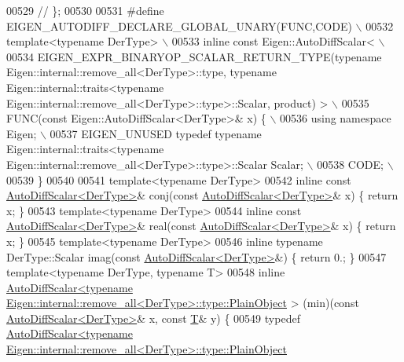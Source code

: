 \begin{DoxyCode}
00529 \textcolor{comment}{// \};}
00530 
00531 \textcolor{preprocessor}{#define EIGEN\_AUTODIFF\_DECLARE\_GLOBAL\_UNARY(FUNC,CODE) \(\backslash\)}
00532 \textcolor{preprocessor}{  template<typename DerType> \(\backslash\)}
00533 \textcolor{preprocessor}{  inline const Eigen::AutoDiffScalar< \(\backslash\)}
00534 \textcolor{preprocessor}{  EIGEN\_EXPR\_BINARYOP\_SCALAR\_RETURN\_TYPE(typename Eigen::internal::remove\_all<DerType>::type, typename
       Eigen::internal::traits<typename Eigen::internal::remove\_all<DerType>::type>::Scalar, product) > \(\backslash\)}
00535 \textcolor{preprocessor}{  FUNC(const Eigen::AutoDiffScalar<DerType>& x) \{ \(\backslash\)}
00536 \textcolor{preprocessor}{    using namespace Eigen; \(\backslash\)}
00537 \textcolor{preprocessor}{    EIGEN\_UNUSED typedef typename Eigen::internal::traits<typename
       Eigen::internal::remove\_all<DerType>::type>::Scalar Scalar; \(\backslash\)}
00538 \textcolor{preprocessor}{    CODE; \(\backslash\)}
00539 \textcolor{preprocessor}{  \}}
00540 
00541 \textcolor{keyword}{template}<\textcolor{keyword}{typename} DerType>
00542 \textcolor{keyword}{inline} \textcolor{keyword}{const} \hyperlink{class_eigen_1_1_auto_diff_scalar}{AutoDiffScalar<DerType>}& conj(\textcolor{keyword}{const} 
      \hyperlink{class_eigen_1_1_auto_diff_scalar}{AutoDiffScalar<DerType>}& x)  \{ \textcolor{keywordflow}{return} x; \}
00543 \textcolor{keyword}{template}<\textcolor{keyword}{typename} DerType>
00544 \textcolor{keyword}{inline} \textcolor{keyword}{const} \hyperlink{class_eigen_1_1_auto_diff_scalar}{AutoDiffScalar<DerType>}& real(\textcolor{keyword}{const} 
      \hyperlink{class_eigen_1_1_auto_diff_scalar}{AutoDiffScalar<DerType>}& x)  \{ \textcolor{keywordflow}{return} x; \}
00545 \textcolor{keyword}{template}<\textcolor{keyword}{typename} DerType>
00546 \textcolor{keyword}{inline} \textcolor{keyword}{typename} DerType::Scalar imag(\textcolor{keyword}{const} \hyperlink{class_eigen_1_1_auto_diff_scalar}{AutoDiffScalar<DerType>}&)    \{ \textcolor{keywordflow}{return} 0.;
       \}
00547 \textcolor{keyword}{template}<\textcolor{keyword}{typename} DerType, \textcolor{keyword}{typename} T>
00548 \textcolor{keyword}{inline} 
      \hyperlink{class_eigen_1_1_auto_diff_scalar}{AutoDiffScalar<typename Eigen::internal::remove\_all<DerType>::type::PlainObject}
      > (min)(\textcolor{keyword}{const} \hyperlink{class_eigen_1_1_auto_diff_scalar}{AutoDiffScalar<DerType>}& x, \textcolor{keyword}{const} \hyperlink{group___sparse_core___module}{T}& y) \{
00549   \textcolor{keyword}{typedef} 
      \hyperlink{class_eigen_1_1_auto_diff_scalar}{AutoDiffScalar<typename Eigen::internal::remove\_all<DerType>::type::PlainObject}

\end{DoxyCode}
